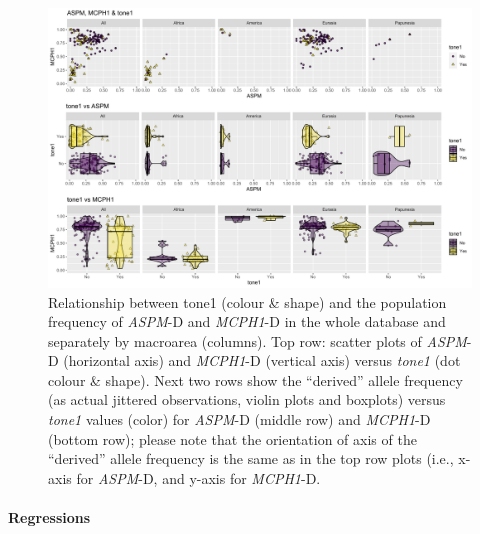 \documentclass[twoside,twocolumn]{article}
\begin{document}
\begin{figure}[h]
  \centering
  \includegraphics[width=\textwidth]{../../code/figures/tone1_genes}
  \caption{Relationship between tone1 (colour \& shape) and the population frequency of \textit{ASPM}-D and \textit{MCPH1}-D in the whole database and separately by macroarea (columns). Top row: scatter plots of \textit{ASPM}-D (horizontal axis) and \textit{MCPH1}-D (vertical axis) versus \textit{tone1} (dot colour \& shape). Next two rows show the ``derived'' allele frequency (as actual jittered observations, violin plots and boxplots) versus \textit{tone1} values (color) for \textit{ASPM}-D (middle row) and \textit{MCPH1}-D (bottom row); please note that the orientation of axis of the ``derived'' allele frequency is the same as in the top row plots (i.e., x-axis for \textit{ASPM}-D, and y-axis for \textit{MCPH1}-D.}
  \label{Fig:tone1_genes}
\end{figure}


\paragraph{Regressions}
\end{document}
